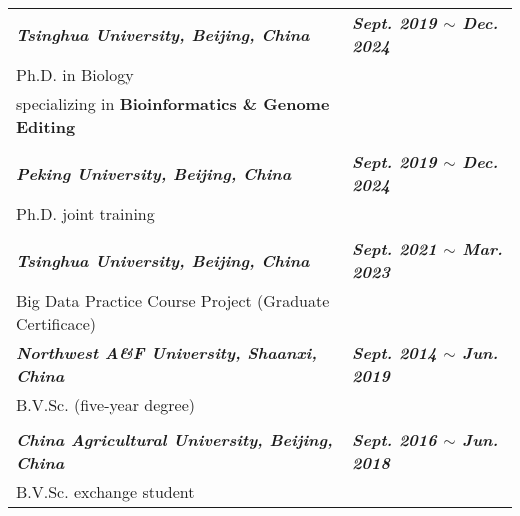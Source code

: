 

\renewcommand{\thefootnote}{\fnsymbol{footnote}}
\setcounter{footnote}{0}
\begin{longtable}{p{} p{}}
    \textit{\textbf{Tsinghua University, Beijing, China}} & \textit{\textbf{Sept. 2019 $\sim$ Dec. 2024\footnotemark[1]}} \\
    Ph.D. in Biology &  \\
    specializing in \textbf{Bioinformatics \& Genome Editing} & \\
    & \\
    \textit{\textbf{Peking University, Beijing, China}} & \textit{\textbf{Sept. 2019 $\sim$ Dec. 2024\footnotemark[1]}} \\
    Ph.D. joint training\footnotemark[2] &  \\
    & \\
    \textit{\textbf{Tsinghua University, Beijing, China}} & \textit{\textbf{Sept. 2021 $\sim$ Mar. 2023}} \\
    Big Data Practice Course Project (Graduate Certificace)

    & \\
    \textit{\textbf{Northwest A\&F University, Shaanxi, China}} & \textit{\textbf{Sept. 2014 $\sim$ Jun. 2019}} \\
    B.V.Sc. (five-year degree) & \\
    & \\
    \textit{\textbf{China Agricultural University, Beijing, China}} & \textit{\textbf{Sept. 2016 $\sim$ Jun. 2018}} \\
    B.V.Sc. exchange student &  \\
\end{longtable}

\renewcommand{\thefootnote}{\arabic{footnote}}
\setcounter{footnote}{1}

